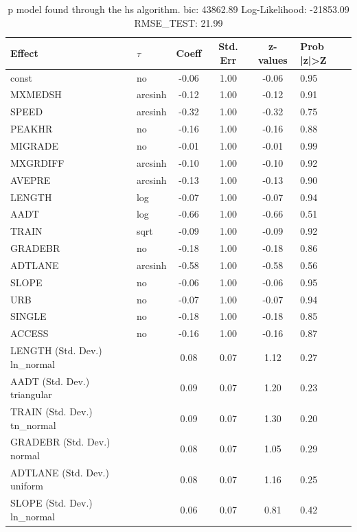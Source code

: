 \begin{table}
	\caption{p model found through the hs algorithm. bic: 43862.89 Log-Likelihood: -21853.09 RMSE_TEST: 21.99}
	\begin{center}
		\begin{tabular}{|l|l|c|c|c|l|}
			\hline
			Effect & $\tau$ & Coeff & Std. Err & z-values & Prob |z|>Z \\
			\hline
			const & no & -0.06 & 1.00 & -0.06 & 0.95 \\
			\hline
			MXMEDSH & arcsinh & -0.12 & 1.00 & -0.12 & 0.91 \\
			\hline
			SPEED & arcsinh & -0.32 & 1.00 & -0.32 & 0.75 \\
			\hline
			PEAKHR & no & -0.16 & 1.00 & -0.16 & 0.88 \\
			\hline
			MIGRADE & no & -0.01 & 1.00 & -0.01 & 0.99 \\
			\hline
			MXGRDIFF & arcsinh & -0.10 & 1.00 & -0.10 & 0.92 \\
			\hline
			AVEPRE & arcsinh & -0.13 & 1.00 & -0.13 & 0.90 \\
			\hline
			LENGTH & log & -0.07 & 1.00 & -0.07 & 0.94 \\
			\hline
			AADT & log & -0.66 & 1.00 & -0.66 & 0.51 \\
			\hline
			TRAIN & sqrt & -0.09 & 1.00 & -0.09 & 0.92 \\
			\hline
			GRADEBR & no & -0.18 & 1.00 & -0.18 & 0.86 \\
			\hline
			ADTLANE & arcsinh & -0.58 & 1.00 & -0.58 & 0.56 \\
			\hline
			SLOPE & no & -0.06 & 1.00 & -0.06 & 0.95 \\
			\hline
			URB & no & -0.07 & 1.00 & -0.07 & 0.94 \\
			\hline
			SINGLE & no & -0.18 & 1.00 & -0.18 & 0.85 \\
			\hline
			ACCESS & no & -0.16 & 1.00 & -0.16 & 0.87 \\
			\hline
			LENGTH (Std. Dev.) ln_normal &  & 0.08 & 0.07 & 1.12 & 0.27 \\
			\hline
			AADT (Std. Dev.) triangular &  & 0.09 & 0.07 & 1.20 & 0.23 \\
			\hline
			TRAIN (Std. Dev.) tn_normal &  & 0.09 & 0.07 & 1.30 & 0.20 \\
			\hline
			GRADEBR (Std. Dev.) normal &  & 0.08 & 0.07 & 1.05 & 0.29 \\
			\hline
			ADTLANE (Std. Dev.) uniform &  & 0.08 & 0.07 & 1.16 & 0.25 \\
			\hline
			SLOPE (Std. Dev.) ln_normal &  & 0.06 & 0.07 & 0.81 & 0.42 \\

\end{tabular}
\end{center}
\end{table}

